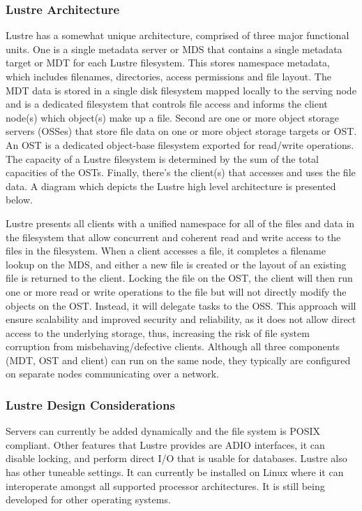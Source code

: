 \documentclass[11pt]{article}
\begin{document}
\subsubsection{Lustre Architecture}
Lustre has a somewhat unique architecture, comprised of three major 
functional units. One is a single metadata server or MDS that contains 
a single metadata target or MDT for each Lustre filesystem. This stores 
namespace metadata, which includes filenames, directories, access 
permissions and file layout. The MDT data is stored in a single disk 
filesystem mapped locally to the serving node and is a dedicated 
filesystem that controls file access and informs the client node(s) 
which object(s) make up a file. Second are one or more object storage 
servers (OSSes) that store file data on one or more object storage 
targets or OST. An OST is a dedicated object-base filesystem exported 
for read/write operations. The capacity of a Lustre filesystem is 
determined by the sum of the total capacities of the OSTs. Finally, 
there's the client(s) that accesses and uses the file data. A diagram 
which depicts the Lustre high level architecture is presented below.


Lustre presents all clients with a unified namespace for all of the 
files and data in the filesystem that allow concurrent and coherent 
read and write access to the files in the filesystem. When a client 
accesses a file, it completes a filename lookup on the MDS, and 
either a new file is created or the layout of an existing file is 
returned to the client. Locking the file on the OST, the client will 
then run one or more read or write operations to the file but will 
not directly modify the objects on the OST. Instead, it will delegate 
tasks to the OSS. This approach will ensure scalability and improved 
security and reliability, as it does not allow direct access to the 
underlying storage, thus, increasing the risk of file system corruption 
from misbehaving/defective clients. Although all three components 
(MDT, OST and client) can run on the same node, they typically are 
configured on separate nodes communicating over a network.

\subsubsection{Lustre Design Considerations}
Servers can currently be added dynamically and the file system is 
POSIX compliant. Other features that Lustre provides are ADIO 
interfaces, it can disable locking, and perform direct I/O that is 
usable for databases. Lustre also has other tuneable settings. It can 
currently be installed on Linux where it can interoperate amongst all 
supported processor architectures. It is still being developed for 
other operating systems.
\end{document}
